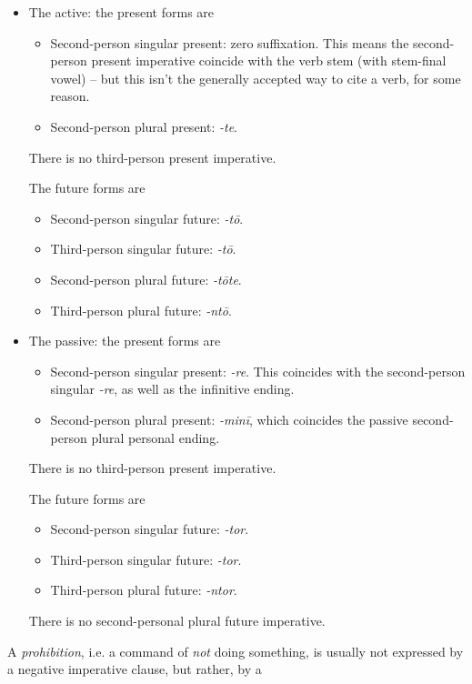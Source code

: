 \documentclass{article}
\newcommand*{\corpus}[1]{\emph{#1}}
\begin{document}
\begin{itemize}
    \item The active:
    the present forms are
    \begin{itemize}
        \item Second-person singular present: zero suffixation. 
        This means the second-person present imperative coincide with the verb stem 
        (with stem-final vowel)
        -- but this isn't the generally accepted way to cite a verb, for some reason.
        \item Second-person plural present: \corpus{-te}.
    \end{itemize}
    There is no third-person present imperative.

    The future forms are
    \begin{itemize}
        \item Second-person singular future: \corpus{-t\={o}}.
        \item Third-person singular future: \corpus{-t\={o}}.
        \item Second-person plural future: \corpus{-t\={o}te}.
        \item Third-person plural future: \corpus{-nt\={o}}.
    \end{itemize}
    \item The passive: 
    the present forms are
    \begin{itemize}
        \item Second-person singular present: \corpus{-re}. 
        This coincides with the second-person singular \corpus{-re},
        as well as the infinitive ending.
        \item Second-person plural present: \corpus{-minī}, 
        which coincides the passive second-person plural personal ending.
    \end{itemize}
    There is no third-person present imperative.

    The future forms are
    \begin{itemize}
        \item Second-person singular future: \corpus{-tor}.
        \item Third-person singular future: \corpus{-tor}.
        \item Third-person plural future: \corpus{-ntor}.
    \end{itemize}
    There is no second-personal plural future imperative.
\end{itemize}

A \emph{prohibition}, i.e. a command of \emph{not} doing something,
is usually not expressed by a negative imperative clause,
but rather, by a %
\end{document}
